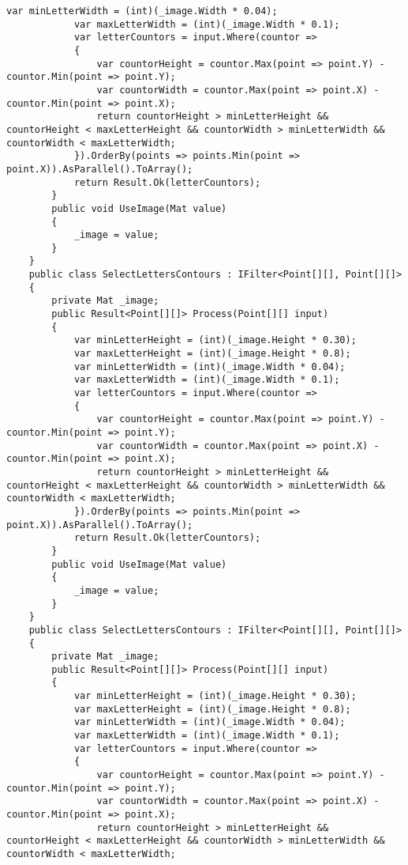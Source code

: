 \begin{lstlisting}[style=fsharpstyle,caption={Исходный код}, label=lst:recognition_result_handler]
            var minLetterWidth = (int)(_image.Width * 0.04);
            var maxLetterWidth = (int)(_image.Width * 0.1);
            var letterCountors = input.Where(countor =>
            {
                var countorHeight = countor.Max(point => point.Y) - countor.Min(point => point.Y);
                var countorWidth = countor.Max(point => point.X) - countor.Min(point => point.X);
                return countorHeight > minLetterHeight && countorHeight < maxLetterHeight && countorWidth > minLetterWidth && countorWidth < maxLetterWidth;
            }).OrderBy(points => points.Min(point => point.X)).AsParallel().ToArray();
            return Result.Ok(letterCountors);
        }
        public void UseImage(Mat value)
        {
            _image = value;
        }
    }
    public class SelectLettersContours : IFilter<Point[][], Point[][]>
    {
        private Mat _image;
        public Result<Point[][]> Process(Point[][] input)
        {
            var minLetterHeight = (int)(_image.Height * 0.30);
            var maxLetterHeight = (int)(_image.Height * 0.8);
            var minLetterWidth = (int)(_image.Width * 0.04);
            var maxLetterWidth = (int)(_image.Width * 0.1);
            var letterCountors = input.Where(countor =>
            {
                var countorHeight = countor.Max(point => point.Y) - countor.Min(point => point.Y);
                var countorWidth = countor.Max(point => point.X) - countor.Min(point => point.X);
                return countorHeight > minLetterHeight && countorHeight < maxLetterHeight && countorWidth > minLetterWidth && countorWidth < maxLetterWidth;
            }).OrderBy(points => points.Min(point => point.X)).AsParallel().ToArray();
            return Result.Ok(letterCountors);
        }
        public void UseImage(Mat value)
        {
            _image = value;
        }
    }
    public class SelectLettersContours : IFilter<Point[][], Point[][]>
    {
        private Mat _image;
        public Result<Point[][]> Process(Point[][] input)
        {
            var minLetterHeight = (int)(_image.Height * 0.30);
            var maxLetterHeight = (int)(_image.Height * 0.8);
            var minLetterWidth = (int)(_image.Width * 0.04);
            var maxLetterWidth = (int)(_image.Width * 0.1);
            var letterCountors = input.Where(countor =>
            {
                var countorHeight = countor.Max(point => point.Y) - countor.Min(point => point.Y);
                var countorWidth = countor.Max(point => point.X) - countor.Min(point => point.X);
                return countorHeight > minLetterHeight && countorHeight < maxLetterHeight && countorWidth > minLetterWidth && countorWidth < maxLetterWidth;

\end{lstlisting}
